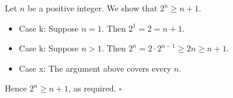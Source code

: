 Let $n$ be a positive integer.
We show that $2^{n} \geq n + 1$.

\begin{itemize}
  \item Case k: Suppose $n = 1$.
    Then $2^{1} = 2 = n + 1$.
  \item Case k: Suppose $n > 1$.
    Then $2^{n} = 2 \cdot 2^{n - 1} \geq 2n \geq n + 1$.
  \item Case x:
    The argument above covers every $n$.
\end{itemize}

Hence $2^{n} \geq n + 1$, as required. \hfill$\square$
